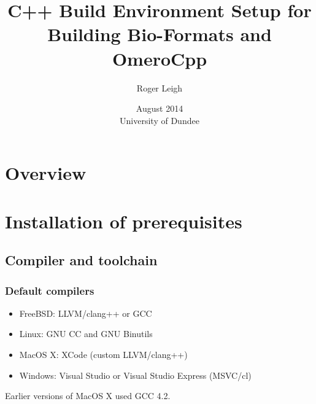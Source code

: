 \documentclass{beamer}
\title{C++ Build Environment Setup for Building Bio-Formats and OmeroCpp}
\author{Roger Leigh}
\date{August 2014\\University of Dundee}
\begin{document}
\begin{frame}[plain]
  \titlepage
  \begin{center}
     \hfill
    \hfill
  \end{center}
\end{frame}

\section[]{Overview}

\section{Installation of prerequisites}
\subsection{Compiler and toolchain}
\begin{frame}
  \frametitle{Default compilers}
  \begin{itemize}
  \item FreeBSD: LLVM/clang++ or GCC
  \item Linux: GNU CC and GNU Binutils
  \item MacOS X: XCode (custom LLVM/clang++)
  \item Windows: Visual Studio or Visual Studio Express (MSVC/cl)
  \end{itemize}

  Earlier versions of MacOS X used GCC 4.2.
\end{frame}
\end{document}
